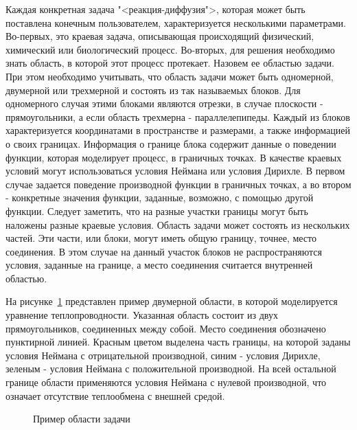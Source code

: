 \documentclass[a4paper, 14pt]{extarticle}
\theoremstyle{definition}
\begin{document}
\par Каждая конкретная задача "<реакция-диффузия">, которая может быть поставлена конечным пользователем, характеризуется несколькими параметрами. Во-первых, это краевая задача, описывающая происходящий физический, химический или биологический процесс. Во-вторых, для решения необходимо знать область, в которой этот процесс протекает. Назовем ее областью задачи. При этом необходимо учитывать, что область задачи может быть одномерной, двумерной или трехмерной и состоять из так называемых блоков. Для одномерного случая этими блоками являются отрезки, в случае плоскости - прямоугольники, а если область трехмерна - параллелепипеды. Каждый из блоков характеризуется координатами в пространстве и размерами, а также информацией о своих границах. Информация о границе блока содержит данные о поведении функции, которая моделирует процесс, в граничных точках. В качестве краевых условий могут использоваться условия Неймана или условия Дирихле. В первом случае задается поведение производной функции в граничных точках, а во втором - конкретные значения функции, заданные, возможно, с помощью другой функции. Следует заметить, что на разные участки границы могут быть наложены разные краевые условия. Область задачи может состоять из нескольких частей. Эти части, или блоки, могут иметь общую границу, точнее, место соединения. В этом случае на данный участок блоков не распространяются условия, заданные на границе, а место соединения считается внутренней областью.

\par На рисунке~\ref{ris:2Block_ex} представлен пример двумерной области, в которой моделируется уравнение теплопроводности. Указанная область состоит из двух прямоугольников, соединенных между собой. Место соединения обозначено пунктирной линией. Красным цветом выделена часть границы, на которой заданы условия Неймана с отрицательной производной, синим - условия Дирихле, зеленым - условия Неймана с положительной производной. На всей остальной границе области применяются условия Неймана с нулевой производной, что означает отсутствие теплообмена с внешней средой.

\begin{figure}[h]
	\caption{Пример области задачи}
	\label{ris:2Block_ex}
\end{figure}
\end{document}

